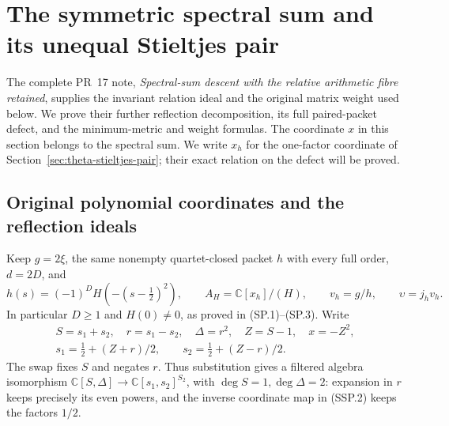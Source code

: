 \section{The symmetric spectral sum and its unequal Stieltjes pair}
\label{sec:spectral-sum-stieltjes-pair}

The complete PR~17 note, \emph{Spectral-sum descent with the relative
arithmetic fibre retained}, supplies the invariant relation ideal and
the original matrix weight used below.  We prove their further
reflection decomposition, its full paired-packet defect, and the
minimum-metric and weight formulas.  The coordinate \(x\) in this
section belongs to the spectral sum.  We write \(x_h\) for the
one-factor coordinate of Section~\ref{sec:theta-stieltjes-pair};
their exact relation on the defect will be proved.

\subsection{Original polynomial coordinates and the reflection ideals}

Keep \(g=2\xi\), the same nonempty quartet-closed packet \(h\) with
every full order, \(d=2D\), and
\[
 h(s)=(-1)^D H(-(s-\tfrac12)^2),\qquad
 A_H=\mathbb C[x_h]/(H),\qquad v_h=g/h,\qquad
 \upsilon=j_hv_h.
 \tag{SSP.1}
\]
In particular \(D\ge1\) and \(H(0)\ne0\), as proved in (SP.1)--(SP.3).
Write
\[
 \begin{gathered}
 S=s_1+s_2,\quad r=s_1-s_2,\quad \Delta=r^2,\quad
 Z=S-1,\quad x=-Z^2,\\
 s_1=\tfrac12+(Z+r)/2,\qquad s_2=\tfrac12+(Z-r)/2.
 \end{gathered}                                                    \tag{SSP.2}
\]
The swap fixes \(S\) and negates \(r\).  Thus substitution gives a
filtered algebra isomorphism
\(\mathbb C[S,\Delta]\to\mathbb C[s_1,s_2]^{S_2}\), with
\(\deg S=1,\deg\Delta=2\): expansion in \(r\) keeps precisely its
even powers, and the inverse coordinate map in (SSP.2) keeps
the factors \(1/2\).

